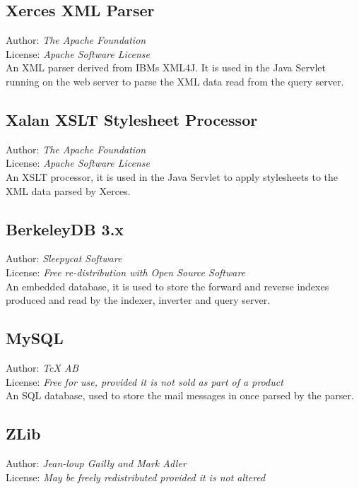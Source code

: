 \subsection{Xerces XML Parser}
Author: \emph{The Apache Foundation} \\
License: \emph{Apache Software License} \\

An XML parser derived from IBMs XML4J.  It is used in the Java Servlet running on the web server to parse the XML data read from the query server.


\subsection{Xalan XSLT Stylesheet Processor}
Author: \emph{The Apache Foundation} \\
License: \emph{Apache Software License} \\

An XSLT processor, it is used in the Java Servlet to apply stylesheets to the XML data parsed by Xerces.

\subsection{BerkeleyDB 3.x}
Author: \emph{Sleepycat Software} \\
License: \emph{Free re-distribution with Open Source Software} \\

An embedded database, it is used to store the forward and reverse indexes produced and read by the indexer, inverter and query server.

\subsection{MySQL}
Author: \emph{TcX AB} \\
License: \emph{Free for use, provided it is not sold as part of a product} \\

An SQL database, used to store the mail messages in once parsed by the parser.

\subsection{ZLib}
Author: \emph{Jean-loup Gailly and Mark Adler} \\
License: \emph{May be freely redistributed provided it is not altered} \\


